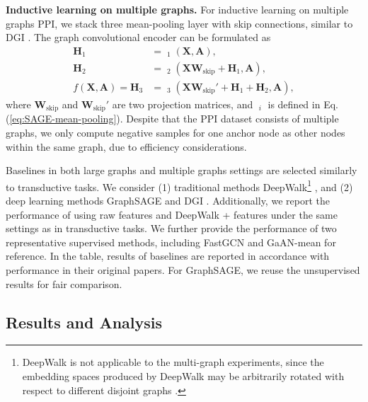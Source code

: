 \documentclass{article}
\theoremstyle{remark}
\DeclareMathOperator{\MP}{\widehat{MP}}
\begin{document}
\textbf{Inductive learning on multiple graphs.\quad}
For inductive learning on multiple graphs PPI, we stack three mean-pooling layer with skip connections, similar to DGI \cite{Velickovic:2019tu}. The graph convolutional encoder can be formulated as
\begin{align}
	\bm H_1 & = \MP_1(\bm X, \bm A), \\
	\bm H_2 & = \MP_2(\bm X \bm W_\text{skip} + \bm H_1, \bm A), \\
	f(\bm X, \bm A) = \bm H_3 &= \MP_3(\bm X \bm W_\text{skip}' + \bm H_1 + \bm H_2, \bm A),
\end{align}
where \(\bm{W}_\text{skip}\) and \(\bm{W}_\text{skip}'\) are two projection matrices, and \(\MP_i\) is defined in Eq. (\ref{eq:SAGE-mean-pooling}).
Despite that the PPI dataset consists of multiple graphs, we only compute negative samples for one anchor node as other nodes within the same graph, due to efficiency considerations.

Baselines in both large graphs and multiple graphs settings are selected similarly to transductive tasks. We consider (1) traditional methods DeepWalk\footnote{DeepWalk is not applicable to the multi-graph experiments, since the embedding spaces produced by DeepWalk may be arbitrarily rotated with respect to different disjoint graphs \cite{Hamilton:2017tp}.} \cite{Perozzi:2014ib}, and (2) deep learning methods GraphSAGE \cite{Hamilton:2017tp} and DGI \cite{Velickovic:2019tu}. Additionally, we report the performance of using raw features and DeepWalk + features under the same settings as in transductive tasks. We further provide the performance of two representative supervised methods, including FastGCN \cite{Chen:2018wp} and GaAN-mean \cite{Zhang:2018vn} for reference. In the table, results of baselines are reported in accordance with performance in their original papers. For GraphSAGE, we reuse the unsupervised results for fair comparison.



\subsection{Results and Analysis}
\end{document}
